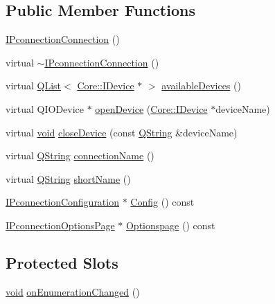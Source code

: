 \subsection*{Public Member Functions}
\begin{DoxyCompactItemize}
\item 
\hyperlink{group___i_p_conn_plugin_ga5eedabe97b32eaee1617cc040476a4b9}{I\-Pconnection\-Connection} ()
\item 
virtual \hyperlink{group___i_p_conn_plugin_ga003fc5feae8a88f8a1ad994b5b688f6e}{$\sim$\-I\-Pconnection\-Connection} ()
\item 
virtual \hyperlink{class_q_list}{Q\-List}$<$ \hyperlink{class_core_1_1_i_device}{Core\-::\-I\-Device} $\ast$ $>$ \hyperlink{group___i_p_conn_plugin_ga046ba69036aa4661e97da3c8fbb13850}{available\-Devices} ()
\item 
virtual Q\-I\-O\-Device $\ast$ \hyperlink{group___i_p_conn_plugin_ga111b86b5f5905dee93d220a847614bed}{open\-Device} (\hyperlink{class_core_1_1_i_device}{Core\-::\-I\-Device} $\ast$device\-Name)
\item 
virtual \hyperlink{group___u_a_v_objects_plugin_ga444cf2ff3f0ecbe028adce838d373f5c}{void} \hyperlink{group___i_p_conn_plugin_gab576cdaa8af931b52cafea033a9c7350}{close\-Device} (const \hyperlink{group___u_a_v_objects_plugin_gab9d252f49c333c94a72f97ce3105a32d}{Q\-String} \&device\-Name)
\item 
virtual \hyperlink{group___u_a_v_objects_plugin_gab9d252f49c333c94a72f97ce3105a32d}{Q\-String} \hyperlink{group___i_p_conn_plugin_ga8709e871725c0d119edddd54db4c505c}{connection\-Name} ()
\item 
virtual \hyperlink{group___u_a_v_objects_plugin_gab9d252f49c333c94a72f97ce3105a32d}{Q\-String} \hyperlink{group___i_p_conn_plugin_gae18fe74813c61e299c3492ea3ac616c5}{short\-Name} ()
\item 
\hyperlink{class_i_pconnection_configuration}{I\-Pconnection\-Configuration} $\ast$ \hyperlink{group___i_p_conn_plugin_ga0e41970926f79a5f86cd89fe61075e03}{Config} () const 
\item 
\hyperlink{class_i_pconnection_options_page}{I\-Pconnection\-Options\-Page} $\ast$ \hyperlink{group___i_p_conn_plugin_ga8d119fd704cfcdca9ae8dc6c3a3c237b}{Optionspage} () const 
\end{DoxyCompactItemize}
\subsection*{Protected Slots}
\begin{DoxyCompactItemize}
\item 
\hyperlink{group___u_a_v_objects_plugin_ga444cf2ff3f0ecbe028adce838d373f5c}{void} \hyperlink{group___i_p_conn_plugin_ga1163b3efc22084c70e47aa84ac84c612}{on\-Enumeration\-Changed} ()
\end{DoxyCompactItemize}


